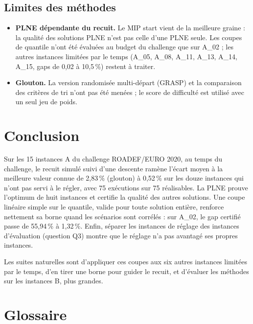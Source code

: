 \documentclass[11pt,a4paper]{report}
\begin{document}
\section{Limites des méthodes}

\begin{itemize}
  \item \textbf{PLNE dépendante du recuit.} Le MIP start vient de la meilleure graine : la qualité des
        solutions PLNE n'est pas celle d'une PLNE seule. Les coupes de quantile n'ont été évaluées au
        budget du challenge que sur A\_02 ; les autres instances limitées par le temps (A\_05, A\_08,
        A\_11, A\_13, A\_14, A\_15, gaps de 0,02 à 10,5\,\%) restent à traiter.
  \item \textbf{Glouton.} La version randomisée multi-départ (GRASP) et la comparaison des critères de
        tri n'ont pas été menées ; le score de difficulté est utilisé avec un seul jeu de poids.
\end{itemize}

\chapter{Conclusion}\label{chap:conclusion}

Sur les 15 instances A du challenge ROADEF/EURO 2020, au temps du challenge, le recuit simulé
suivi d'une descente ramène l'écart moyen à la meilleure valeur connue de 2,83\,\% (glouton) à
0,52\,\% sur les douze instances qui n'ont pas servi à le régler, avec 75 exécutions sur 75
réalisables. La PLNE prouve l'optimum de huit instances et certifie la qualité des autres solutions.
Une coupe linéaire simple sur le quantile, valide pour toute solution entière, renforce nettement sa
borne quand les scénarios sont corrélés : sur A\_02, le gap certifié passe de 55,94\,\% à 1,32\,\%.
Enfin, séparer les instances de réglage des instances d'évaluation (question Q3) montre que le
réglage n'a pas avantagé ses propres instances.

Les suites naturelles sont d'appliquer ces coupes aux six autres instances limitées par le temps,
d'en tirer une borne pour guider le recuit, et d'évaluer les méthodes sur les instances B, plus
grandes.

\chapter*{Glossaire}\label{chap:glossaire}
\end{document}
